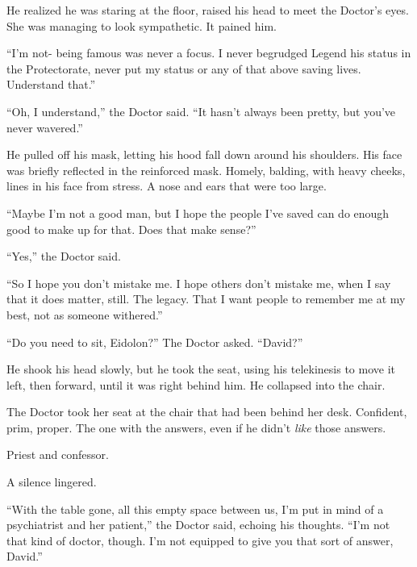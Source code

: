 He realized he was staring at the floor, raised his head to meet the Doctor's eyes.  She was managing to look sympathetic.  It pained him.



``I'm not- being famous was never a focus.  I never begrudged Legend his status in the Protectorate, never put my status or any of that above saving lives.  Understand that.''



``Oh, I understand,'' the Doctor said.  ``It hasn't always been pretty, but you've never wavered.''



He pulled off his mask, letting his hood fall down around his shoulders.  His face was briefly reflected in the reinforced mask.  Homely, balding, with heavy cheeks, lines in his face from stress.  A nose and ears that were too large.



``Maybe I'm not a good man, but I hope the people I've saved can do enough good to make up for that.  Does that make sense?''



``Yes,'' the Doctor said.



``So I hope you don't mistake me.  I hope others don't mistake me, when I say that it does matter, still.  The legacy.  That I want people to remember me at my best, not as someone withered.''



``Do you need to sit, Eidolon?''  The Doctor asked.  ``David?''



He shook his head slowly, but he took the seat, using his telekinesis to move it left, then forward, until it was right behind him.  He collapsed into the chair.



The Doctor took her seat at the chair that had been behind her desk.  Confident, prim, proper.  The one with the answers, even if he didn't \emph{like} those answers.



Priest and confessor.



A silence lingered.



``With the table gone, all this empty space between us, I'm put in mind of a psychiatrist and her patient,'' the Doctor said, echoing his thoughts.  ``I'm not that kind of doctor, though.  I'm not equipped to give you that sort of answer, David.''




